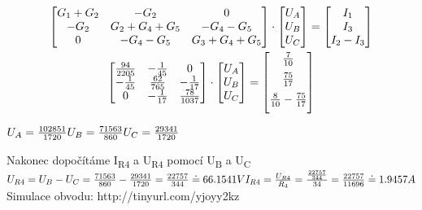 \documentclass[12pt,a4paper]{article} %
\begin{document}
		\bigskip
		\medskip
	\begin{gather*}
		\begin{bmatrix}
			G_1 + G_2	&	-G_2            & 0 \\
			-G_2		&	G_2 + G_4 + G_5 & -G_4 - G_5 \\
			0           & -G_4 - G_5        & G_3 + G_4 + G_5
		\end{bmatrix}
		\cdot
		\begin{bmatrix}
			U_A \\
			U_B \\
			U_C \\
		\end{bmatrix}
		=
		\begin{bmatrix}
			I_1 \\
			I_3 \\
			I_2 - I_3 \\
		\end{bmatrix}
		\\
		\begin{bmatrix}
			\frac{94}{2205}		&	-\frac{1}{45}   &   0 \\
			-\frac{1}{45}       &   \frac{62}{765}  &   -\frac{1}{17}\\
			0                   &   -\frac{1}{17}   &   \frac{78}{1037}
		\end{bmatrix}
		\cdot
		\begin{bmatrix}
			U_A \\
			U_B \\
			U_C \\
		\end{bmatrix}
		=
		\begin{bmatrix}
			\medskip
			\frac{7}{10} \\
			\medskip
			\frac{75}{17} \\
			\medskip
			\frac{8}{10}-\frac{75}{17}
		\end{bmatrix}
	\end{gather*}
	\medskip
	
    \(
    \\U_A = \frac{102851}{1720}
    \medskip
    \\U_B = \frac{71563}{860}
    \medskip
    \\U_C = \frac{29341}{1720}
    \)
	 
	 \medskip
	  
	Nakonec dopočítáme I\textsubscript{R4} a U\textsubscript{R4} pomocí U\textsubscript{B} a U\textsubscript{C}
    \medskip
        \(
        \\U_{R4} = U_{B} - U_{C} = \frac{71563}{860} - \frac{29341}{1720} = \frac{22757}{344} \doteq 
        66.1541 V
        \medskip
		\\I_{R4} = \frac{U_{R4}}{R_4} = \frac{\frac{22757}{344}}{34} = \frac{22757}{11696} \doteq 1.9457 A
		\medskip
	    \)
    \medskip
		\\Simulace obvodu: http://tinyurl.com/yjoyy2kz
	\clearpage
\end{document}
